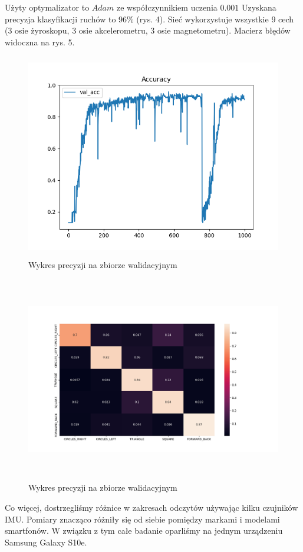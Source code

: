 \documentclass[10pt]{article}
\begin{document}
Użyty optymalizator to $Adam$ ze współczynnikiem uczenia $0.001$
 Uzyskana precyzja klasyfikacji ruchów to 96\% (rys. 4). Sieć wykorzystuje wszystkie 9 cech (3 osie żyroskopu, 3 osie akcelerometru, 3 osie magnetometru). Macierz błędów widoczna na rys. 5.

 \begin{figure}[H]
  \includegraphics[height=9cm]{acc.png}
  \centering
  \caption{Wykres precyzji na zbiorze walidacyjnym}
\end{figure}

\begin{figure}[H]
  \includegraphics[height=9cm]{conf.png}
  \centering
  \caption{Wykres precyzji na zbiorze walidacyjnym}
\end{figure}

Co więcej, dostrzegliśmy różnice w zakresach odczytów używając kilku czujników IMU. Pomiary znacząco różniły się od siebie pomiędzy markami i modelami smartfonów. W związku z tym całe badanie oparliśmy na jednym urządzeniu Samsung Galaxy S10e.
\end{document}
